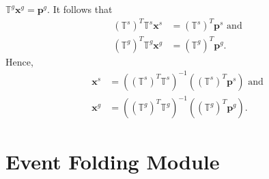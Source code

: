 \documentclass[final,oneside,onecolumn,12pt,a4paper]{book}%
\begin{document}
$\mathbb{T}^{g}\mathbf{x}^{g}=\mathbf{p}^{g}$. It follows that
\begin{align*}
\left(  \mathbb{T}^{s}\right)  ^{T}\mathbb{T}^{s}\mathbf{x}^{s}  &  =\left(
\mathbb{T}^{s}\right)  ^{T}\mathbf{p}^{s}\text{ and}\\
\left(  \mathbb{T}^{g}\right)  ^{T}\mathbb{T}^{g}\mathbf{x}^{g}  &  =\left(
\mathbb{T}^{g}\right)  ^{T}\mathbf{p}^{g}\text{.}%
\end{align*}
Hence,
\begin{align}
\mathbf{x}^{s}  &  =\left(  \left(  \mathbb{T}^{s}\right)  ^{T}\mathbb{T}%
^{s}\right)  ^{-1}\left(  \left(  \mathbb{T}^{s}\right)  ^{T}\mathbf{p}%
^{s}\right)  \text{ and}\label{eq:e_equation_congestion}\\
\mathbf{x}^{g}  &  =\left(  \left(  \mathbb{T}^{g}\right)  ^{T}\mathbb{T}%
^{g}\right)  ^{-1}\left(  \left(  \mathbb{T}^{g}\right)  ^{T}\mathbf{p}%
^{g}\right)  \text{.} \label{eq:e_equation_relief}%
\end{align}


\section{Event Folding Module}

\label{sec:folding_technique}
\end{document}
